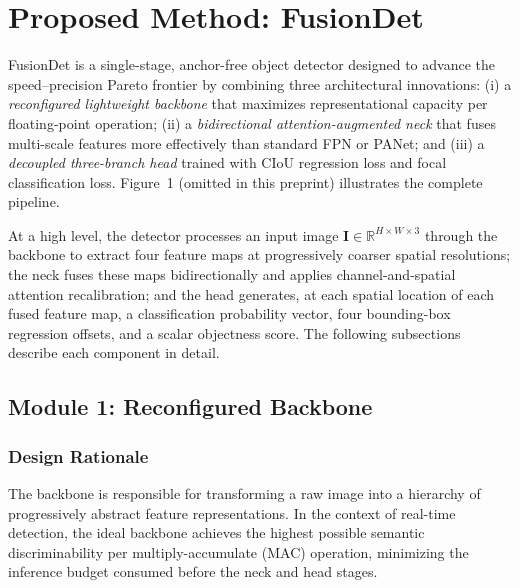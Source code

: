 
\section{Proposed Method: FusionDet}
\label{sec:method}

FusionDet is a single-stage, anchor-free object detector
designed to advance the speed--precision Pareto frontier by
combining three architectural innovations: (i) a
\textit{reconfigured lightweight backbone} that maximizes
representational capacity per floating-point operation; (ii) a
\textit{bidirectional attention-augmented neck} that fuses
multi-scale features more effectively than standard FPN or
PANet; and (iii) a \textit{decoupled three-branch head} trained
with CIoU regression loss and focal classification loss.
Figure~1 (omitted in this preprint)
illustrates the complete pipeline.

At a high level, the detector processes an input image
$\mathbf{I} \in \mathbb{R}^{H \times W \times 3}$ through the
backbone to extract four feature maps at progressively coarser
spatial resolutions; the neck fuses these maps bidirectionally
and applies channel-and-spatial attention recalibration; and
the head generates, at each spatial location of each fused
feature map, a classification probability vector, four
bounding-box regression offsets, and a scalar objectness score.
The following subsections describe each component in detail.

\subsection{Module 1: Reconfigured Backbone}

\subsubsection{Design Rationale}

The backbone is responsible for transforming a raw image into
a hierarchy of progressively abstract feature representations.
In the context of real-time detection, the ideal backbone
achieves the highest possible semantic discriminability per
multiply-accumulate (MAC) operation, minimizing the inference
budget consumed before the neck and head stages.

